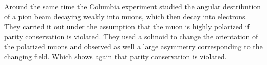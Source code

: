 Around the same time the Columbia experiment studied the angular destribution of a pion beam decaying weakly into muons, which then decay into electrons. They carried it out under the assumption that the muon is highly polarized if parity conservation is violated. They used a solinoid to change the orientation of the polarized muons and observed as well a large asymmetry corresponding to the changing field. Which shows again that parity conservation is violated.

